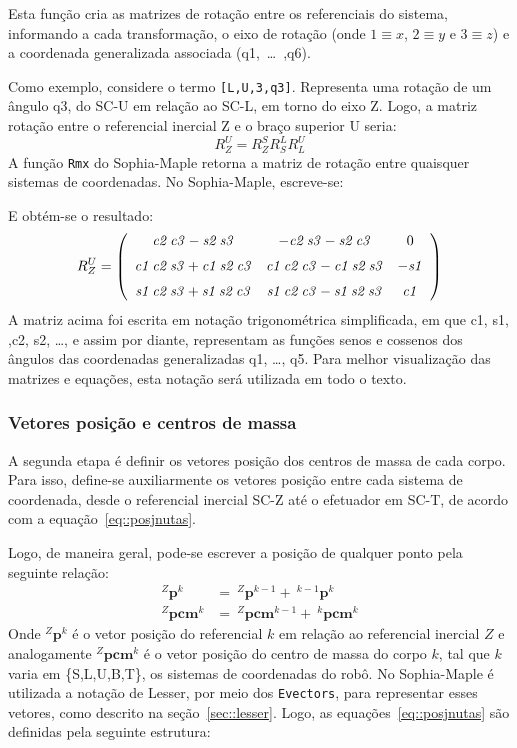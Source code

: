 Esta função cria as matrizes de rotação entre os referenciais do sistema,
informando a cada transformação, o eixo de rotação
(onde $1 \equiv x$, $2 \equiv y$ e $3 \equiv z$) e a coordenada generalizada
associada (q1,~\ldots~,q6).

Como exemplo, considere o termo {\tt [L,U,3,q3]}. Representa uma rotação de um
ângulo q3, do SC-U em relação ao SC-L, em torno do eixo Z.
Logo, a matriz rotação entre o referencial inercial Z e o braço
superior U seria:
%
$$ R_{Z}^{U} = R_{Z}^{S} R_{S}^{L} R_{L}^{U} $$
%
A função \texttt{Rmx} do Sophia-Maple retorna a matriz de rotação entre quaisquer
sistemas de coordenadas. No Sophia-Maple, escreve-se:

\bigskip {} \bigskip 

E obtém-se o resultado:
%
$$ R_{Z}^{U} = \left( \begin {array}{ccc} {\it c2}\,{\it c3}-{\it s2}\,{\it
s3}&-{ \it c2}\,{\it s3}-{\it s2}\,{\it c3}&0\\ \noalign{\medskip}{\it c1}\,{
\it c2}\,{\it s3}+{\it c1}\,{\it s2}\,{\it c3}&{\it c1}\,{\it c2}\,{
\it c3}-{\it c1}\,{\it s2}\,{\it s3}&-{\it s1}\\ \noalign{\medskip}{
\it s1}\,{\it c2}\,{\it s3}+{\it s1}\,{\it s2}\,{\it c3}&{\it s1}\,{
\it c2}\,{\it c3}-{\it s1}\,{\it s2}\,{\it s3}&{\it c1}\end {array}
 \right) $$
 A matriz acima foi escrita em notação trigonométrica simplificada, em que c1,
 s1, ,c2, s2, \ldots, e assim por diante, representam as funções senos e
 cossenos dos ângulos das coordenadas generalizadas q1, \ldots, q5. Para melhor
 visualização das matrizes e equações, esta notação será utilizada em todo o
 texto.
 
\subsubsection{Vetores posição e centros de massa}

A segunda etapa é definir os vetores posição dos centros de massa de cada corpo.
Para isso, define-se auxiliarmente os vetores posição entre cada sistema de
coordenada, desde o referencial inercial SC-Z até o efetuador em SC-T, de
acordo com a equação~\ref{eq::posjnutas}.

Logo, de maneira geral, pode-se escrever a posição de qualquer ponto pela
seguinte relação:
%
\begin{align}
	^{Z}\mathbf{p}^{k} &= ~^{Z}\mathbf{p}^{k-1} + ~^{k-1}\mathbf{p}^{k}
	\label{eq::posjnutas} \\
	^{Z}\mathbf{pcm}^{k} &= ~^{Z}\mathbf{pcm}^{k-1} + ~^{k}\mathbf{pcm}^k
	\label{eq::pcm}
\end{align}
%
Onde $^{Z}\mathbf{p}^{k}$ é o vetor posição do referencial $k$ em relação ao
referencial inercial $Z$ e analogamente $^{Z}\mathbf{pcm}^{k}$ é o vetor
posição do centro de massa do corpo $k$, tal que $k$ varia em \{S,L,U,B,T\},
os sistemas de coordenadas do robô.
No Sophia-Maple é utilizada a notação de Lesser, por meio dos \texttt{Evectors},
para representar esses vetores, como descrito na seção~\ref{sec::lesser}. Logo,
as equações~\ref{eq::posjnutas} são definidas pela seguinte
estrutura:

